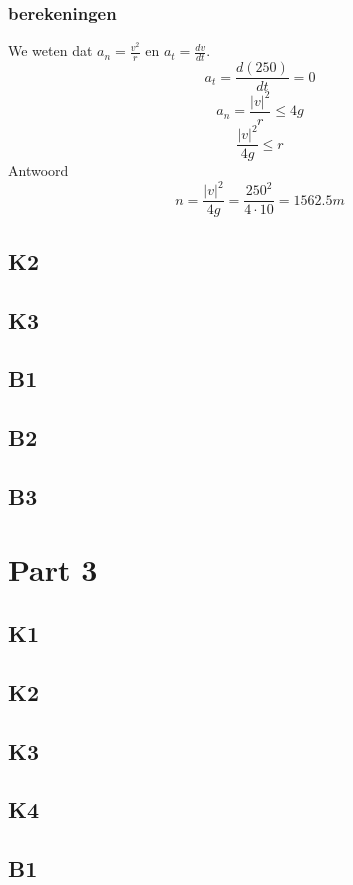 \documentclass[10pt,a4paper]{article}
\begin{document}
\subsubsection*{berekeningen}
We weten dat $a_n=\frac{v^2}{r}$ en  $a_t = \frac{dv}{dt}$.
\[
a_t=\frac{d(250)}{dt} = 0
\]
\[
a_n = \frac{|v|^2}{r} \le 4g
\]
\[
\frac{|v|^2}{4g}\le r
\]
Antwoord
\[
n= \frac{|v|^2}{4g} = \frac{250^2}{4 \cdot 10} = 1562.5m
\]

\subsection{K2}

\subsection{K3}

\subsection{B1}

\subsection{B2}

\subsection{B3}

\section{Part 3}
\subsection{K1}

\subsection{K2}

\subsection{K3}

\subsection{K4}

\subsection{B1}
\end{document}
